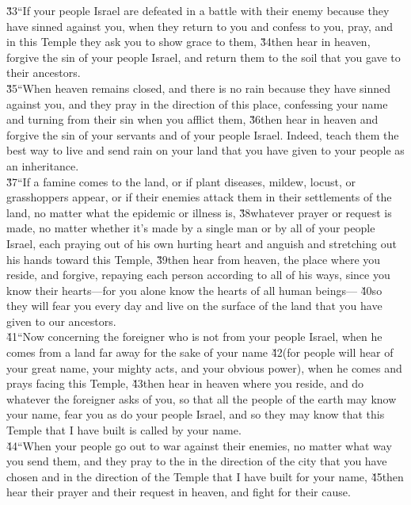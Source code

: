 \begin{poetry}
\poeml \v{33}``If your people Israel are defeated in a battle with their enemy because they have sinned against you, when they return to you and confess to you, pray, and in this Temple they ask you to show grace to them, \v{34}then hear in heaven, forgive the sin of your people Israel, and return them to the soil that you gave to their ancestors. \\
\poeml \v{35}``When heaven remains closed, and there is no rain because they have sinned against you, and they pray in the direction of this place, confessing your name and turning from their sin when you afflict them, \v{36}then hear in heaven and forgive the sin of your servants and of your people Israel. Indeed, teach them the best way to live and send rain on your land that you have given to your people as an inheritance. \\
\poeml \v{37}``If a famine comes to the land, or if plant diseases, mildew, locust, or grasshoppers appear, or if their enemies attack them in their settlements of the land, no matter what the epidemic or illness is, \v{38}whatever prayer or request is made, no matter whether it's made by a single man or by all of your people Israel, each praying out of his own hurting heart and anguish and stretching out his hands toward this Temple, \v{39}then hear from heaven, the place where you reside, and forgive, repaying each person according to all of his ways, since you know their hearts---for you alone know the hearts of all human beings--- \v{40}so they will fear you every day and live on the surface of the land that you have given to our ancestors. \\
\poeml \v{41}``Now concerning the foreigner who is not from your people Israel, when he comes from a land far away for the sake of your name \v{42}(for people will hear of your great name, your mighty acts, and your obvious power), when he comes and prays facing this Temple, \v{43}then hear in heaven where you reside, and do whatever the foreigner asks of you, so that all the people of the earth may know your name, fear you as do your people Israel, and so they may know that this Temple that I have built is called by your name. \\
\poeml \v{44}``When your people go out to war against their enemies, no matter what way you send them, and they pray to the  in the direction of the city that you have chosen and in the direction of the Temple that I have built for your name, \v{45}then hear their prayer and their request in heaven, and fight for their cause. \\

\end{poetry}
